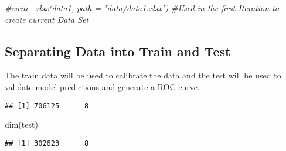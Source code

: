 \documentclass[
]{article}
\newenvironment{Shaded}{\begin{snugshade}}{\end{snugshade}}
\newcommand{\AttributeTok}[1]{\textcolor[rgb]{0.77,0.63,0.00}{#1}}
\newcommand{\CommentTok}[1]{\textcolor[rgb]{0.56,0.35,0.01}{\textit{#1}}}
\newcommand{\ConstantTok}[1]{\textcolor[rgb]{0.00,0.00,0.00}{#1}}
\newcommand{\DecValTok}[1]{\textcolor[rgb]{0.00,0.00,0.81}{#1}}
\newcommand{\FloatTok}[1]{\textcolor[rgb]{0.00,0.00,0.81}{#1}}
\newcommand{\FunctionTok}[1]{\textcolor[rgb]{0.00,0.00,0.00}{#1}}
\newcommand{\NormalTok}[1]{#1}
\newcommand{\OtherTok}[1]{\textcolor[rgb]{0.56,0.35,0.01}{#1}}
\newcommand{\SpecialCharTok}[1]{\textcolor[rgb]{0.00,0.00,0.00}{#1}}
\begin{document}
\begin{Shaded}
\begin{Highlighting}[]
\CommentTok{\#write\_xlsx(data1, path = "data/data1.xlsx") }
\CommentTok{\#Used in the first Iteration to create current Data Set}
\end{Highlighting}
\end{Shaded}

\hypertarget{separating-data-into-train-and-test}{%
\subsection{Separating Data into Train and
Test}\label{separating-data-into-train-and-test}}

The train data will be used to calibrate the data and the test will be
used to validate model predictions and generate a ROC curve.

\begin{Shaded}
\end{Shaded}

\begin{verbatim}
## [1] 706125      8
\end{verbatim}

\begin{Shaded}
\begin{Highlighting}[]
\FunctionTok{dim}\NormalTok{(test)}
\end{Highlighting}
\end{Shaded}

\begin{verbatim}
## [1] 302623      8
\end{verbatim}
\end{document}

